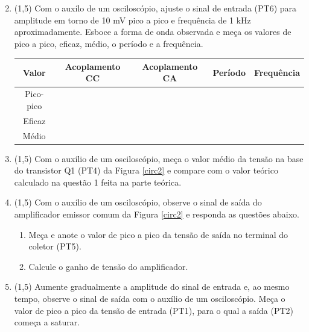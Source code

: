 \documentclass[11pt]{article}
\begin{document}
\begin{enumerate}
\setcounter{enumi}{1}

\item (1,5) Com o auxílo de um osciloscópio, ajuste o sinal de entrada (PT6) para amplitude em torno de 10 mV pico a pico e frequência de 1 kHz aproximadamente. Esboce a forma de onda observada e meça os valores de pico a pico, eficaz, médio, o período e a frequência.

\begin{figure}[!h]
	\centering
\end{figure}

\begin{table}[!h]
\centering
\begin{tabular}{|c|c|c|c|c|}
\hline
Valor & Acoplamento CC & Acoplamento CA & Período & Frequência\\\hline
Pico-pico & & & & \\\cline{1-3}
Eficaz & & & & \\\cline{1-3}
Médio & & & & \\\hline
\end{tabular}
\end{table}
	\item (1,5) Com o auxílio de um osciloscópio, meça o valor médio da tensão na base do transistor Q1 (PT4) da Figura \ref{circ2} e compare com o valor teórico calculado na questão 1 feita na parte teórica.
	\item (1,5) Com o auxílio de um osciloscópio, observe o sinal de saída do amplificador emissor comum da Figura \ref{circ2} e responda as questões abaixo.
	\begin{enumerate}
		\item Meça e anote o valor de pico a pico da tensão de saída no terminal do coletor (PT5).
		\item Calcule o ganho de tensão do amplificador.
	\end{enumerate}
	\item (1,5) Aumente gradualmente a amplitude do sinal de entrada e, ao mesmo tempo, observe o sinal de saída com o auxílio de um osciloscópio. Meça o valor de pico a pico da tensão de entrada (PT1), para o qual a saída (PT2) começa a saturar.
\end{enumerate}
\end{document}

